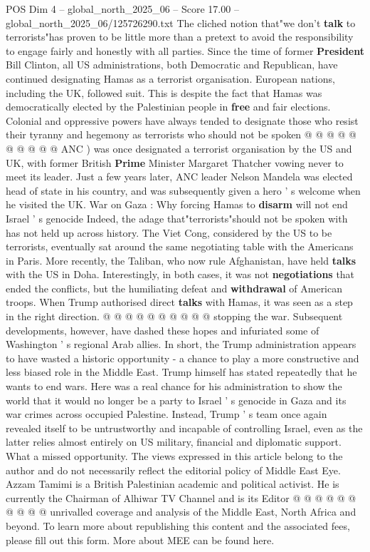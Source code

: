 \begin{textsample}{POS Dim 4 – global\_north\_2025\_06 – Score 17.00 – global\_north\_2025\_06/125726290.txt}
The cliched notion that"we don't \textbf{talk} to terrorists"has proven to be little more than a pretext to avoid the responsibility to engage fairly and honestly with all parties.
Since the time of former \textbf{President} Bill Clinton, all US administrations, both Democratic and Republican, have continued designating Hamas as a terrorist organisation.
European nations, including the UK, followed suit.
This is despite the fact that Hamas was democratically elected by the Palestinian people in \textbf{free} and fair elections.
Colonial and oppressive powers have always tended to designate those who resist their tyranny and hegemony as terrorists who should not be spoken @ @ @ @ @ @ @ @ @ @ ANC ) was once designated a terrorist organisation by the US and UK, with former British \textbf{Prime} Minister Margaret Thatcher vowing never to meet its leader.
Just a few years later, ANC leader Nelson Mandela was elected head of state in his country, and was subsequently given a hero ' s welcome when he visited the UK.
War on Gaza : Why forcing Hamas to \textbf{disarm} will not end Israel ' s genocide Indeed, the adage that"terrorists"should not be spoken with has not held up across history.
The Viet Cong, considered by the US to be terrorists, eventually sat around the same negotiating table with the Americans in Paris.
More recently, the Taliban, who now rule Afghanistan, have held \textbf{talks} with the US in Doha.
Interestingly, in both cases, it was not \textbf{negotiations} that ended the conflicts, but the humiliating defeat and \textbf{withdrawal} of American troops.
When Trump authorised direct \textbf{talks} with Hamas, it was seen as a step in the right direction. @ @ @ @ @ @ @ @ @ @ stopping the war.
Subsequent developments, however, have dashed these hopes and infuriated some of Washington ' s regional Arab allies.
In short, the Trump administration appears to have wasted a historic opportunity - a chance to play a more constructive and less biased role in the Middle East.
Trump himself has stated repeatedly that he wants to end wars.
Here was a real chance for his administration to show the world that it would no longer be a party to Israel ' s genocide in Gaza and its war crimes across occupied Palestine.
Instead, Trump ' s team once again revealed itself to be untrustworthy and incapable of controlling Israel, even as the latter relies almost entirely on US military, financial and diplomatic support.
What a missed opportunity.
The views expressed in this article belong to the author and do not necessarily reflect the editorial policy of Middle East Eye.
Azzam Tamimi is a British Palestinian academic and political activist.
He is currently the Chairman of Alhiwar TV Channel and is its Editor @ @ @ @ @ @ @ @ @ @ unrivalled coverage and analysis of the Middle East, North Africa and beyond.
To learn more about republishing this content and the associated fees, please fill out this form.
More about MEE can be found here.

\end{textsample}
